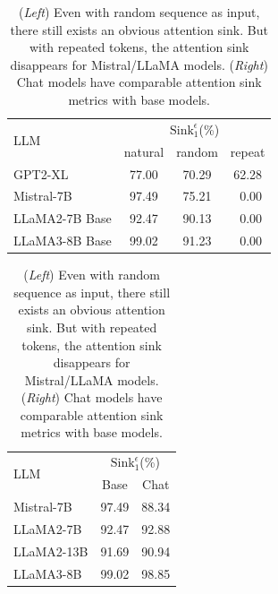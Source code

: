\begin{table}[t]
\vspace{-1.1cm}
\caption{(\emph{Left}) Even with random sequence as input, there still exists an obvious attention sink. But with repeated tokens, the attention sink disappears for Mistral/LLaMA models. (\emph{Right}) Chat models have comparable attention sink metrics with base models.}
\vspace{-0.2cm}
\begin{minipage}[t]{0.54\linewidth}
\begin{center}
\begin{tabular}{l|ccc}
\toprule
\multirow{2}{*}{LLM} & \multicolumn{3}{c}{$\textrm{Sink}_1^{\epsilon}$(\%)} \\
& natural & random & repeat\\
\midrule
GPT2-XL  & 77.00 & 70.29 & 62.28 \\
Mistral-7B &  97.49 & 75.21 & \,\,\,0.00 \\
LLaMA2-7B Base & 92.47 & 90.13 & \,\,\,0.00 \\
LLaMA3-8B Base & 99.02 & 91.23 & \,\,\,0.00\\
\bottomrule
\end{tabular}
\end{center}
\end{minipage}
\hfill
\begin{minipage}[t]{0.40\linewidth}
\begin{center}
\begin{tabular}{l|cc}
\toprule
\multirow{2}{*}{LLM} & \multicolumn{2}{c}{$\textrm{Sink}_1^{\epsilon}$(\%)} \\
& Base & Chat\\
\midrule
Mistral-7B & 97.49 & 88.34 \\
LLaMA2-7B & 92.47 & 92.88 \\
LLaMA2-13B & 91.69 & 90.94 \\
LLaMA3-8B & 99.02 & 98.85\\
\bottomrule
\end{tabular}
\end{center}
\end{minipage}
\vspace{-.3cm}
\label{input}
\end{table}

